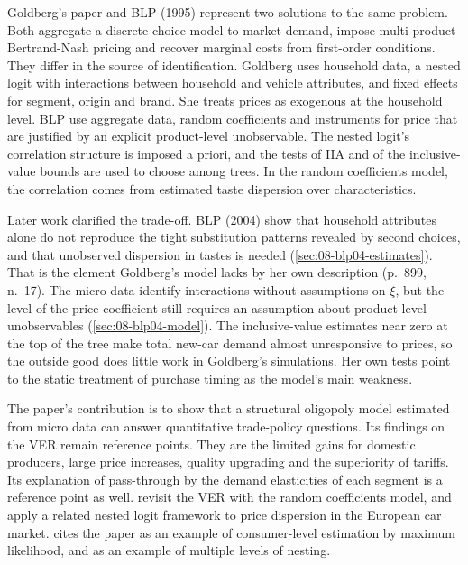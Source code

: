 Goldberg's paper and BLP (1995) represent two solutions to the same problem. Both aggregate a discrete choice
model to market demand, impose multi-product Bertrand-Nash pricing and recover marginal costs from first-order
conditions. They differ in the source of identification. Goldberg uses household data, a nested logit with
interactions between household and vehicle attributes, and fixed effects for segment, origin and brand. She
treats prices as exogenous at the household level. BLP use aggregate data, random coefficients and
instruments for price that are justified by an explicit product-level unobservable. The nested logit's
correlation structure is imposed a priori, and the tests of IIA and of the inclusive-value bounds are used to
choose among trees. In the random coefficients model, the correlation comes from estimated taste dispersion
over characteristics.

Later work clarified the trade-off. BLP (2004) show that household attributes alone do not reproduce the tight
substitution patterns revealed by second choices, and that unobserved dispersion in tastes is needed
(\cref{sec:08-blp04-estimates}). That is the element Goldberg's model lacks by her own description (p.~899,
n.~17). The micro data identify interactions without assumptions on $\xi$, but the level of the price
coefficient still requires an assumption about product-level unobservables (\cref{sec:08-blp04-model}). The
inclusive-value estimates near zero at the top of the tree make total new-car demand almost unresponsive to
prices, so the outside good does little work in Goldberg's simulations. Her own tests point to the static
treatment of purchase timing as the model's main weakness.

The paper's contribution is to show that a structural oligopoly model estimated from micro data can answer
quantitative trade-policy questions. Its findings on the VER remain reference points. They are the limited gains for
domestic producers, large price increases, quality upgrading and the superiority of tariffs. Its explanation of
pass-through by the demand elasticities of each segment is a reference point as well. \citet{BerryLevinsohnPakes1999} revisit the VER with the
random coefficients model, and \citet{GoldbergVerboven2001} apply a related nested logit framework to price
dispersion in the European car market. \citet[p.~544]{Nevo2000a} cites the paper as an example of
consumer-level estimation by maximum likelihood, and \citet[p.~524, n.~17]{Nevo2000a} as an example of multiple
levels of nesting.

